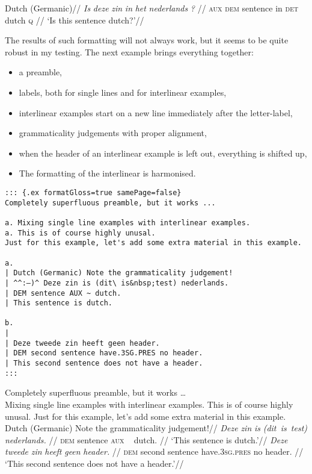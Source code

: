 \documentclass[
]{article}
\providecommand{\tightlist}{%
  \setlength{\itemsep}{0pt}\setlength{\parskip}{0pt}}
\begin{document}
\begin{samepage}
  \begingl
  \glpreamble Dutch (Germanic)//
  \gla \emph{Is} \emph{deze} \emph{zin} \emph{in} \emph{het}
\emph{nederlands} \emph{?} //
  \glb \textsc{aux} \textsc{dem} sentence in \textsc{det} dutch
\textsc{q} //
  \glft `Is this sentence dutch?'//
  \endgl
\xe
\end{samepage}

The results of such formatting will not always work, but it seems to be
quite robust in my testing. The next example brings everything together:

\begin{itemize}
\tightlist
\item
  a preamble,
\item
  labels, both for single lines and for interlinear examples,
\item
  interlinear examples start on a new line immediately after the
  letter-label,
\item
  grammaticality judgements with proper alignment,
\item
  when the header of an interlinear example is left out, everything is
  shifted up,
\item
  The formatting of the interlinear is harmonised.
\end{itemize}

\begin{verbatim}
::: {.ex formatGloss=true samePage=false}
Completely superfluous preamble, but it works ...

a. Mixing single line examples with interlinear examples.
a. This is of course highly unusal.
Just for this example, let's add some extra material in this example.

a.
| Dutch (Germanic) Note the grammaticality judgement!
| ^^:–)^ Deze zin is (dit\ is&nbsp;test) nederlands.
| DEM sentence AUX ~ dutch.
| This sentence is dutch.

b.
|
| Deze tweede zin heeft geen header.
| DEM second sentence have.3SG.PRES no header.
| This second sentence does not have a header.
:::
\end{verbatim}

 Completely superfluous preamble, but it works
\ldots{}\\
  \a Mixing single line examples with interlinear examples.
  \a This is of course highly unusal. Just for this example, let's add
some extra material in this example.
  \a 
  \begingl
  \glpreamble Dutch (Germanic) Note the grammaticality judgement!//
  \gla \ljudge{\textsuperscript{:--)}}\emph{Deze} \emph{zin} \emph{is}
\emph{(dit~is~test)} \emph{nederlands.} //
  \glb \textsc{dem} sentence \textsc{aux}  ~  dutch. //
  \glft `This sentence is dutch.'//
  \endgl
  \a 
  \begingl
  \gla \emph{Deze} \emph{tweede} \emph{zin} \emph{heeft} \emph{geen}
\emph{header.} //
  \glb \textsc{dem} second sentence have.\textsc{3sg}.\textsc{pres} no
header. //
  \glft `This second sentence does not have a header.'//
  \endgl
\xe
\end{document}
